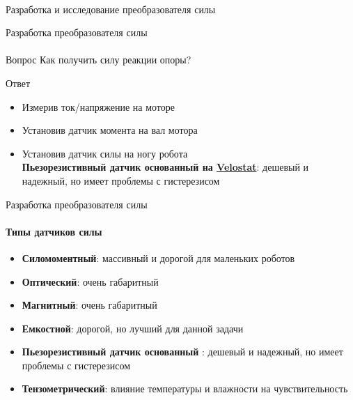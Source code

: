 \documentclass[aspectratio=169,xcolor=table]{beamer}
\begin{document}
\begin{frame}[c]{}
    \framesubtitle{}
    \centering\LARGE Разработка и исследование преобразователя силы
\end{frame}

\begin{frame}[t]{Разработка преобразователя силы}
    \framesubtitle{}
    {\large\begin{block}{Вопрос}
            Как получить силу реакции опоры?
        \end{block}}
    {\large\begin{alertblock}{Ответ}
            \vspace{-0.2cm}

            \begin{itemize}
                \color{lightgray}
                \item Измерив ток/напряжение на моторе
                \item Установив датчик момента на вал мотора
                \item {\color{black} Установив датчик силы на ногу робота \\  \alert{\textbf{Пьезорезистивный датчик основанный на \underline{Velostat}}: дешевый и надежный, но имеет проблемы с гистерезисом}}
            \end{itemize}
        \end{alertblock}}
\end{frame}

\begin{frame}[t]{Разработка преобразователя силы}
    \framesubtitle{Типы датчиков силы}
    \vspace{-20pt}
    \begin{multicols}{2}
        \begin{itemize}
            \item  \textbf{Силомоментный}: массивный и дорогой для маленьких роботов
            \item \textbf{Оптический}: очень габаритный
            \item \textbf{Магнитный}: очень габаритный
            \item \textbf{Емкостной}: дорогой, но лучший для данной задачи
            \item {\color{black}\textbf{Пьезорезистивный датчик основанный }: дешевый и надежный, но имеет проблемы с гистерезисом}

            \item {  \textbf{Тензометрический}: влияние температуры и влажности на чувствительность}
        \end{itemize}
    \end{multicols}
    \vspace{-10pt}
\end{frame}
\end{document}
